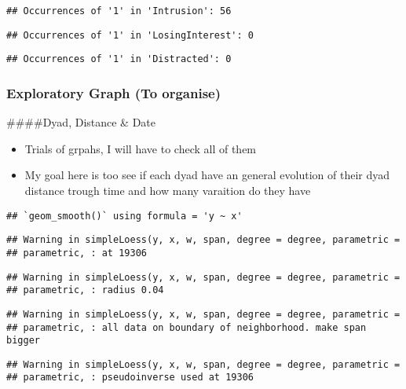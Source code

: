 \documentclass[
]{article}
\begin{document}
\begin{verbatim}
## Occurrences of '1' in 'Intrusion': 56
\end{verbatim}

\begin{verbatim}
## Occurrences of '1' in 'LosingInterest': 0
\end{verbatim}

\begin{verbatim}
## Occurrences of '1' in 'Distracted': 0
\end{verbatim}

\hypertarget{exploratory-graph-to-organise}{%
\subsubsection{Exploratory Graph (To
organise)}\label{exploratory-graph-to-organise}}

\#\#\#\#Dyad, Distance \& Date

\begin{itemize}
\item
  Trials of grpahs, I will have to check all of them
\item
  My goal here is too see if each dyad have an general evolution of
  their dyad distance trough time and how many varaition do they have
\end{itemize}

\begin{verbatim}
## `geom_smooth()` using formula = 'y ~ x'
\end{verbatim}

\begin{verbatim}
## Warning in simpleLoess(y, x, w, span, degree = degree, parametric =
## parametric, : at 19306
\end{verbatim}

\begin{verbatim}
## Warning in simpleLoess(y, x, w, span, degree = degree, parametric =
## parametric, : radius 0.04
\end{verbatim}

\begin{verbatim}
## Warning in simpleLoess(y, x, w, span, degree = degree, parametric =
## parametric, : all data on boundary of neighborhood. make span bigger
\end{verbatim}

\begin{verbatim}
## Warning in simpleLoess(y, x, w, span, degree = degree, parametric =
## parametric, : pseudoinverse used at 19306
\end{verbatim}
\end{document}
